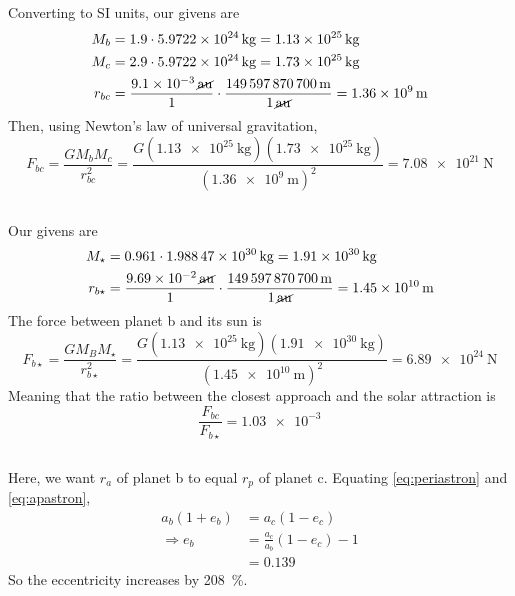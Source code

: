 \documentclass{article}
\begin{document}
Converting to SI units, our givens are
\begin{align}
    M_b &= 1.9 \cdot \SI{5.9722e+24}{\kilogram} = \SI{1.13e+25}{\kilogram} \\
    M_c &= 2.9 \cdot \SI{5.9722e+24}{\kilogram} = \SI{1.73e+25}{\kilogram} \\
    r_{bc} &= \frac{\SI{9.1e-3}{\cancel\astronomicalunit}}{1} \cdot \frac{\SI{149597870700}{\meter}}{\SI{1}{\cancel\astronomicalunit}} = \SI{1.36e+9}{\meter}
\end{align}
Then, using Newton's law of universal gravitation,
\begin{equation}
    F_{bc} = \frac{G M_b M_c}{r_{bc}^2} = \frac{G (\SI{1.13e+25}{\kilogram}) (\SI{1.73e+25}{\kilogram})}{(\SI{1.36e+9}{\meter})^2} = \SI{7.08e+21}{\newton}
\end{equation}

\subsection{}

Our givens are
\begin{align}
    M_\star &= 0.961 \cdot \SI{1.98847e+30}{\kilogram} = \SI{1.91e+30}{\kilogram}\\
    r_{b\star} &= \frac{\SI{9.69e-2}{\cancel\astronomicalunit}}{1} \cdot \frac{\SI{149597870700}{\meter}}{\SI{1}{\cancel\astronomicalunit}} = \SI{1.45e+10}{\meter}
\end{align}
The force between planet b and its sun is
\begin{equation}
    F_{b\star} = \frac{G M_B M_\star}{r_{b\star}^2} = \frac{G (\SI{1.13e+25}{\kilogram}) (\SI{1.91e+30}{\kilogram})}{(\SI{1.45e+10}{\meter})^2} = \SI{6.89e+24}{\newton}
\end{equation}
Meaning that the ratio between the closest approach and the solar attraction is
\begin{equation}
    \frac{F_{bc}}{F_{b\star}} = \num{1.03e-3}
\end{equation}

\subsection{}

Here, we want \(r_a\) of planet b to equal \(r_p\) of planet c.
Equating \autoref{eq:periastron} and \autoref{eq:apastron},
\begin{align}
    a_b (1 + e_b) &= a_c (1 - e_c) \\
    \Rightarrow e_b &= \frac{a_c}{a_b} (1 - e_c) - 1 \\
    &= 0.139
\end{align}
So the eccentricity increases by \SI{208}{\percent}.
\end{document}
